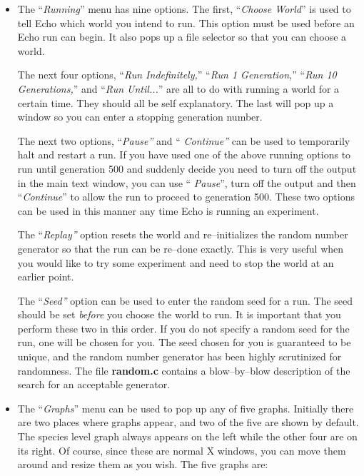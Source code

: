 \begin{itemize}
\item
The ``{\sl Running}''  menu has nine options. The
first, ``{\sl Choose World}''  is used to tell
Echo which world you intend to run. This option must be used before an
Echo run can begin. It also pops up a file selector so that you can
choose a world.

The next four options,  ``{\sl Run
Indefinitely,}'' ``{\sl Run 1 Generation,}'' ``{\sl Run 10
Generations,}'' and ``{\sl Run Until...}''  are all to do with running
a world for a certain time. They should all be self explanatory. The
last will pop up a window so you can enter a stopping generation
number.

The next two options, ``{\sl Pause''}  and ``{\sl
Continue''}  can be used to temporarily
halt and restart a run. If you have used one of the above running
options to run until generation 500 and suddenly decide you need to
turn off the output in the main text window, you can use ``{\sl
Pause}'', turn off the output and then ``{\sl Continue}'' to allow the
run to proceed to generation 500. These two options can be used in
this manner any time Echo is running an experiment.

The ``{\sl Replay''}  option resets the world
and re--initializes the random number generator so that the run can be
re--done exactly. This is very useful when you would like to try some
experiment and need to stop the world at an earlier point.

The ``{\sl Seed''}  option can be used to enter
the random seed for a run.  The seed should be set {\em before} you
choose the world to run. It is important that you perform these two in
this order. If you do not specify a random seed for the run, one will
be chosen for you. The seed chosen for you is guaranteed to be unique,
and the random number generator has been highly scrutinized for
randomness. The file {\bf random.c} contains a blow--by--blow
description of the search for an acceptable generator.

\item
The ``{\sl Graphs}'' \label{graphs-menu}  menu can
be used to pop up any of five graphs. Initially there are two places
where graphs appear, and two of the five are shown by default. The
species level graph always appears on the left while the other four
are on its right. Of course, since these are normal X windows, you can
move them around and resize them as you wish.  The five graphs are:


\end{itemize}
